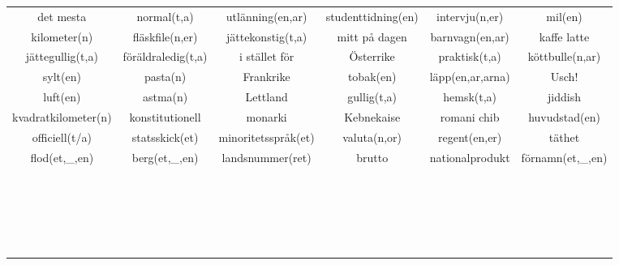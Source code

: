 \begin{center}
\begin{adjustwidth}{-2.7cm}{}
\begin{tabular}{|c c c c c c|}
            det mesta & normal(t,a) & utlänning(en,ar) & studenttidning(en) & intervju(n,er) & mil(en) \\
            kilometer(n) & fläskfile(n,er) & jättekonstig(t,a) & mitt på dagen & barnvagn(en,ar) & kaffe latte \\
            jättegullig(t,a) & föräldraledig(t,a) & i stället för & Österrike & praktisk(t,a) & köttbulle(n,ar) \\
            sylt(en) & pasta(n) & Frankrike & tobak(en) & läpp(en,ar,arna) & Usch! \\
            luft(en) & astma(n) & Lettland & gullig(t,a) & hemsk(t,a) & jiddish \\
            kvadratkilometer(n) & konstitutionell & monarki & Kebnekaise & romani chib & huvudstad(en) \\
            officiell(t/a) & statsskick(et) & minoritetsspråk(et) & valuta(n,or) & regent(en,er) & täthet \\
            flod(et,\_,en) & berg(et,\_,en) & landsnummer(ret) & brutto & nationalprodukt & förnamn(et,\_,en) \\
             &  &  &  &  &  \\
             &  &  &  &  &  \\
             &  &  &  &  &  \\
             &  &  &  &  &  \\
             &  &  &  &  &  \\
             &  &  &  &  &  \\
             &  &  &  &  &  \\
             &  &  &  &  &  \\
             &  &  &  &  &  \\
             &  &  &  &  &  \\
             &  &  &  &  &  \\
             &  &  &  &  &  \\
             &  &  &  &  &  \\
             &  &  &  &  &  \\
             &  &  &  &  &  \\
             &  &  &  &  &  \\
             &  &  &  &  &  \\
             &  &  &  &  &  \\
             &  &  &  &  &  \\
             &  &  &  &  &  \\
             &  &  &  &  &  \\
            \hline
        \end{tabular}
    \end{adjustwidth}
\end{center}

